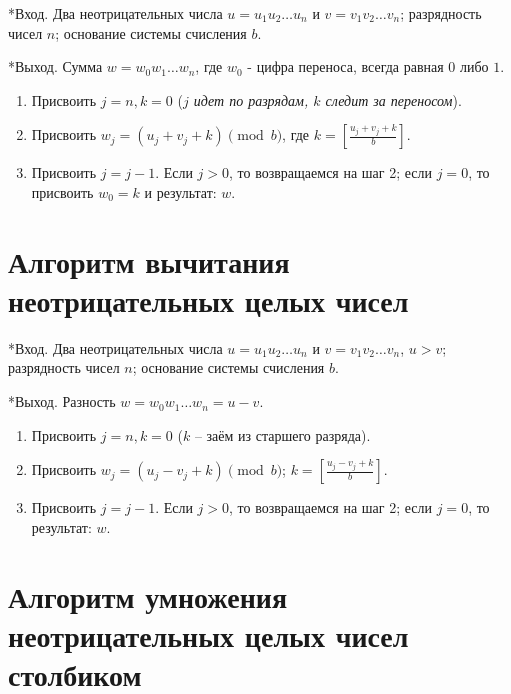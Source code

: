 \documentclass[
  english,
  russian,
  12pt,
  a4paper,
  DIV=11,
  numbers=noendperiod]{scrreprt}
\providecommand{\tightlist}{%
  \setlength{\itemsep}{0pt}\setlength{\parskip}{0pt}}
\begin{document}
*Вход. Два неотрицательных числа \(u = u_1 u_2 \ldots u_n\) и
\(v = v_1 v_2 \ldots v_n\); разрядность чисел \(n\); основание системы
счисления \(b\).

*Выход. Сумма \(w = w_0 w_1 \ldots w_n\), где \(w_0\) - цифра переноса,
всегда равная \(0\) либо \(1\).

\begin{enumerate}
\def\labelenumi{\arabic{enumi}.}
\tightlist
\item
  Присвоить \(j = n, k = 0\) (\emph{\(j\) идет по разрядам, \(k\) следит
  за переносом}).
\item
  Присвоить \(w_j = (u_j + v_j + k) \pmod{b}\), где
  \(k = \left[ \frac{u_j + v_j + k}{b} \right]\).
\item
  Присвоить \(j = j - 1\). Если \(j > 0\), то возвращаемся на шаг 2;
  если \(j = 0\), то присвоить \(w_0 = k\) и результат: \(w\).
\end{enumerate}

\section{Алгоритм вычитания неотрицательных целых
чисел}\label{ux430ux43bux433ux43eux440ux438ux442ux43c-ux432ux44bux447ux438ux442ux430ux43dux438ux44f-ux43dux435ux43eux442ux440ux438ux446ux430ux442ux435ux43bux44cux43dux44bux445-ux446ux435ux43bux44bux445-ux447ux438ux441ux435ux43b}

*Вход. Два неотрицательных числа \(u = u_1 u_2 \ldots u_n\) и
\(v = v_1 v_2 \ldots v_n\), \(u > v\); разрядность чисел \(n\);
основание системы счисления \(b\).

*Выход. Разность \(w = w_0 w_1 \ldots w_n = u - v\).

\begin{enumerate}
\def\labelenumi{\arabic{enumi}.}
\tightlist
\item
  Присвоить \(j = n, k = 0\) (\(k\) -- заём из старшего разряда).
\item
  Присвоить \(w_j = (u_j - v_j + k) \pmod{b}\);
  \(k = \left[ \frac{u_j - v_j + k}{b} \right]\).
\item
  Присвоить \(j = j - 1\). Если \(j > 0\), то возвращаемся на шаг 2;
  если \(j = 0\), то результат: \(w\).
\end{enumerate}

\section{Алгоритм умножения неотрицательных целых чисел
столбиком}\label{ux430ux43bux433ux43eux440ux438ux442ux43c-ux443ux43cux43dux43eux436ux435ux43dux438ux44f-ux43dux435ux43eux442ux440ux438ux446ux430ux442ux435ux43bux44cux43dux44bux445-ux446ux435ux43bux44bux445-ux447ux438ux441ux435ux43b-ux441ux442ux43eux43bux431ux438ux43aux43eux43c}
\end{document}
